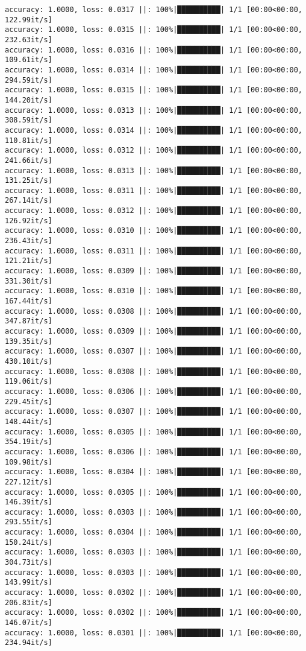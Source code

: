 \documentclass[
]{article}
\begin{document}
\begin{verbatim}
accuracy: 1.0000, loss: 0.0317 ||: 100%|██████████| 1/1 [00:00<00:00, 122.99it/s]
accuracy: 1.0000, loss: 0.0315 ||: 100%|██████████| 1/1 [00:00<00:00, 232.63it/s]
accuracy: 1.0000, loss: 0.0316 ||: 100%|██████████| 1/1 [00:00<00:00, 109.61it/s]
accuracy: 1.0000, loss: 0.0314 ||: 100%|██████████| 1/1 [00:00<00:00, 294.59it/s]
accuracy: 1.0000, loss: 0.0315 ||: 100%|██████████| 1/1 [00:00<00:00, 144.20it/s]
accuracy: 1.0000, loss: 0.0313 ||: 100%|██████████| 1/1 [00:00<00:00, 308.59it/s]
accuracy: 1.0000, loss: 0.0314 ||: 100%|██████████| 1/1 [00:00<00:00, 110.81it/s]
accuracy: 1.0000, loss: 0.0312 ||: 100%|██████████| 1/1 [00:00<00:00, 241.66it/s]
accuracy: 1.0000, loss: 0.0313 ||: 100%|██████████| 1/1 [00:00<00:00, 131.25it/s]
accuracy: 1.0000, loss: 0.0311 ||: 100%|██████████| 1/1 [00:00<00:00, 267.14it/s]
accuracy: 1.0000, loss: 0.0312 ||: 100%|██████████| 1/1 [00:00<00:00, 126.92it/s]
accuracy: 1.0000, loss: 0.0310 ||: 100%|██████████| 1/1 [00:00<00:00, 236.43it/s]
accuracy: 1.0000, loss: 0.0311 ||: 100%|██████████| 1/1 [00:00<00:00, 121.21it/s]
accuracy: 1.0000, loss: 0.0309 ||: 100%|██████████| 1/1 [00:00<00:00, 331.30it/s]
accuracy: 1.0000, loss: 0.0310 ||: 100%|██████████| 1/1 [00:00<00:00, 167.44it/s]
accuracy: 1.0000, loss: 0.0308 ||: 100%|██████████| 1/1 [00:00<00:00, 347.87it/s]
accuracy: 1.0000, loss: 0.0309 ||: 100%|██████████| 1/1 [00:00<00:00, 139.35it/s]
accuracy: 1.0000, loss: 0.0307 ||: 100%|██████████| 1/1 [00:00<00:00, 430.10it/s]
accuracy: 1.0000, loss: 0.0308 ||: 100%|██████████| 1/1 [00:00<00:00, 119.06it/s]
accuracy: 1.0000, loss: 0.0306 ||: 100%|██████████| 1/1 [00:00<00:00, 229.45it/s]
accuracy: 1.0000, loss: 0.0307 ||: 100%|██████████| 1/1 [00:00<00:00, 148.44it/s]
accuracy: 1.0000, loss: 0.0305 ||: 100%|██████████| 1/1 [00:00<00:00, 354.19it/s]
accuracy: 1.0000, loss: 0.0306 ||: 100%|██████████| 1/1 [00:00<00:00, 109.98it/s]
accuracy: 1.0000, loss: 0.0304 ||: 100%|██████████| 1/1 [00:00<00:00, 227.12it/s]
accuracy: 1.0000, loss: 0.0305 ||: 100%|██████████| 1/1 [00:00<00:00, 146.39it/s]
accuracy: 1.0000, loss: 0.0303 ||: 100%|██████████| 1/1 [00:00<00:00, 293.55it/s]
accuracy: 1.0000, loss: 0.0304 ||: 100%|██████████| 1/1 [00:00<00:00, 150.24it/s]
accuracy: 1.0000, loss: 0.0303 ||: 100%|██████████| 1/1 [00:00<00:00, 304.73it/s]
accuracy: 1.0000, loss: 0.0303 ||: 100%|██████████| 1/1 [00:00<00:00, 143.99it/s]
accuracy: 1.0000, loss: 0.0302 ||: 100%|██████████| 1/1 [00:00<00:00, 206.83it/s]
accuracy: 1.0000, loss: 0.0302 ||: 100%|██████████| 1/1 [00:00<00:00, 146.07it/s]
accuracy: 1.0000, loss: 0.0301 ||: 100%|██████████| 1/1 [00:00<00:00, 234.94it/s]

\end{verbatim}
\end{document}

